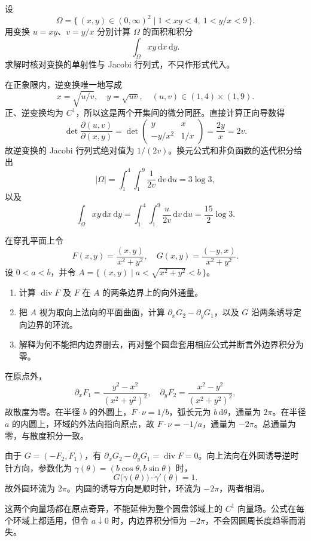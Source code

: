 \begin{exercise}\label{b2:ex:01-product-ratio-change}
设
\[
 \Omega=\{\,(x,y)\in(0,\infty)^2\mid1<xy<4,\ 1<y/x<9\,\}.
\]
用变换 \(u=xy\)、\(v=y/x\) 分别计算 \(\Omega\) 的面积和积分
\[
 \int_\Omega xy\,\mathrm dx\,\mathrm dy.
\]
求解时核对变换的单射性与 Jacobi 行列式，不只作形式代入。
\end{exercise}
\begin{solution}
在正象限内，逆变换唯一地写成
\[
 x=\sqrt{u/v},\quad y=\sqrt{uv},
 \quad (u,v)\in(1,4)\times(1,9).
\]
正、逆变换均为 \(C^1\)，所以这是两个开集间的微分同胚。直接计算正向导数得
\[
 \det\dfrac{\partial(u,v)}{\partial(x,y)}
 =\det\begin{pmatrix}y&x\\-y/x^2&1/x\end{pmatrix}
 =\dfrac{2y}{x}=2v.
\]
故逆变换的 Jacobi 行列式绝对值为 \(1/(2v)\)。换元公式和非负函数的迭代积分给出
\[
 |\Omega|=\int_1^4\int_1^9\dfrac{1}{2v}\,\mathrm dv\,\mathrm du
 =3\log3,
\]
以及
\[
 \int_\Omega xy\,\mathrm dx\,\mathrm dy
 =\int_1^4\int_1^9\dfrac{u}{2v}\,\mathrm dv\,\mathrm du
 =\dfrac{15}{2}\log3.
\]
\end{solution}

\begin{exercise}\label{b2:ex:01-annulus-orientation}
在穿孔平面上令
\[
 F(x,y)=\dfrac{(x,y)}{x^2+y^2},\quad
 G(x,y)=\dfrac{(-y,x)}{x^2+y^2}.
\]
设 \(0<a<b\)，并令 \(A=\{\,(x,y)\mid a<\sqrt{x^2+y^2}<b\,\}\)。
\begin{enumerate}
 \item\label{b2:item:01-annulus-flux} 计算 \(\operatorname{div}F\) 及 \(F\) 在 \(A\) 的两条边界上的向外通量。
 \item\label{b2:item:01-annulus-circulation} 把 \(A\) 视为取向上法向的平面曲面，计算 \(\partial_xG_2-\partial_yG_1\)，以及 \(G\) 沿两条诱导定向边界的环流。
 \item\label{b2:item:01-annulus-singularity} 解释为何不能把内边界删去，再对整个圆盘套用相应公式并断言外边界积分为零。
\end{enumerate}
\end{exercise}
\begin{solution}
在原点外，
\[
 \partial_xF_1=\dfrac{y^2-x^2}{(x^2+y^2)^2},\quad
 \partial_yF_2=\dfrac{x^2-y^2}{(x^2+y^2)^2},
\]
故散度为零。在半径 \(b\) 的外圆上，\(F\cdot\nu=1/b\)，弧长元为 \(b\,\mathrm d\theta\)，通量为 \(2\pi\)。在半径 \(a\) 的内圆上，环域的外法向指向原点，故 \(F\cdot\nu=-1/a\)，通量为 \(-2\pi\)。总通量为零，与散度积分一致。

由于 \(G=(-F_2,F_1)\)，有 \(\partial_xG_2-\partial_yG_1=\operatorname{div}F=0\)。向上法向在外圆诱导逆时针方向，参数化为 \(\gamma(\theta)=(b\cos\theta,b\sin\theta)\) 时，
\[
 G\bigl(\gamma(\theta)\bigr)\cdot\gamma'(\theta)=1.
\]
故外圆环流为 \(2\pi\)。内圆的诱导方向是顺时针，环流为 \(-2\pi\)，两者相消。

这两个向量场都在原点奇异，不能延伸为整个圆盘邻域上的 \(C^1\) 向量场。公式在每个环域上都适用，但令 \(a\downarrow0\) 时，内边界积分恒为 \(-2\pi\)，不会因圆周长度趋零而消失。
\end{solution}

